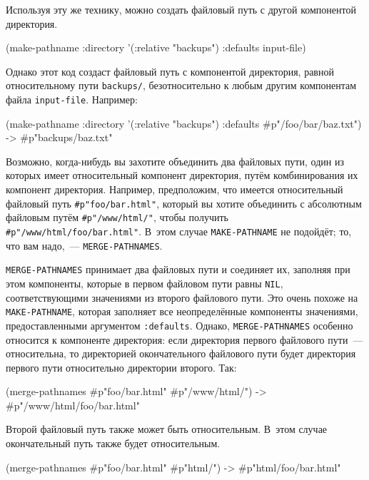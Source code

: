 Используя эту же технику, можно создать файловый путь с другой компонентой директория.

\begin{myverb}
(make-pathname :directory '(:relative "backups") :defaults input-file) 
\end{myverb}

Однако этот код создаст файловый путь с компонентой директория, равной относительному пути
\lstinline!backups/!, безотносительно к любым другим компонентам файла \lstinline!input-file!.
Например:

\begin{myverb}
(make-pathname :directory '(:relative "backups") 
               :defaults #p"/foo/bar/baz.txt") -> #p"backups/baz.txt" 
\end{myverb}

Возможно, когда-нибудь вы захотите объединить два файловых пути, один из которых имеет
относительный компонент директория, путём комбинирования их компонент
директория. Например, предположим, что имеется относительный файловый путь
\lstinline!#p"foo/bar.html"!, который вы хотите объединить с абсолютным файловым путём
\lstinline!#p"/www/html/"!, чтобы получить \lstinline!#p"/www/html/foo/bar.html"!. В~этом
случае \lstinline{MAKE-PATHNAME} не подойдёт; то, что вам надо,~--- \lstinline{MERGE-PATHNAMES}.

\lstinline{MERGE-PATHNAMES} принимает два файловых пути и соединяет их, заполняя при этом
компоненты, которые в первом файловом пути равны \lstinline{NIL}, соответствующими значениями
из второго файлового пути. Это очень похоже на \lstinline{MAKE-PATHNAME}, которая заполняет все
неопределённые компоненты значениями, предоставленными аргументом
\lstinline{:defaults}. Однако, \lstinline{MERGE-PATHNAMES} особенно относится к компоненте
директория: если директория первого файлового пути~--- относительна, то директорией
окончательного файлового пути будет директория первого пути относительно директории
второго. Так:

\begin{myverb}
(merge-pathnames #p"foo/bar.html" #p"/www/html/") -> #p"/www/html/foo/bar.html" 
\end{myverb}

Второй файловый путь также может быть относительным. В~этом случае окончательный путь
также будет относительным.

\begin{myverb}
(merge-pathnames #p"foo/bar.html" #p"html/") -> #p"html/foo/bar.html" 
\end{myverb}

